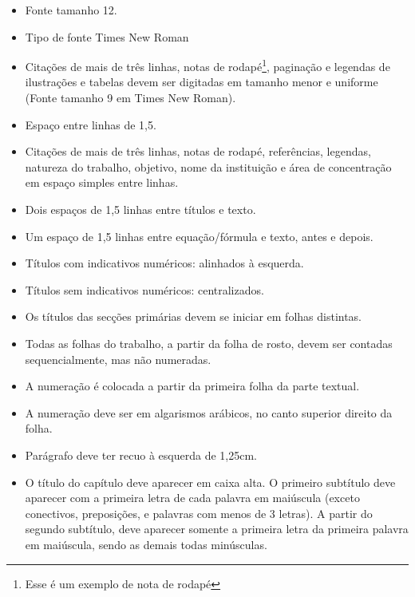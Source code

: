 \documentclass{templateppgmo}
\numberwithin{figure}{chapter}
\numberwithin{table}{chapter}
\numberwithin{quadro}{chapter}
\numberwithin{algoritmo}{chapter}
\numberwithin{codigo}{chapter}
\begin{document}
\begin{itemize}
\item Fonte tamanho 12.

\item Tipo de fonte Times New Roman

\item Citações de mais de três linhas, notas de rodapé\footnote{Esse é um exemplo de nota de rodapé}, paginação e legendas de ilustrações e tabelas devem ser digitadas em tamanho menor e uniforme (Fonte tamanho 9 em Times New Roman).

\item Espaço entre linhas de 1,5.

\item Citações de mais de três linhas, notas de rodapé, referências, legendas, natureza do trabalho, objetivo, nome da instituição e área de concentração em espaço simples entre linhas.

\item Dois espaços de 1,5 linhas entre títulos e texto. 

\item Um espaço de 1,5 linhas entre equação/fórmula e texto, antes e depois.

\item Títulos com indicativos numéricos: alinhados à esquerda.

\item Títulos sem indicativos numéricos: centralizados. 

\item Os títulos das secções primárias devem se iniciar em folhas distintas.

\item Todas as folhas do trabalho, a partir da folha de rosto, devem ser contadas sequencialmente, mas não numeradas. 

\item A numeração é colocada a partir da primeira folha da parte textual. 

\item A numeração deve ser em algarismos arábicos, no canto superior direito da folha. 

\item Parágrafo deve ter recuo à esquerda de 1,25cm.

\item O título do capítulo deve aparecer em caixa alta. O primeiro subtítulo deve aparecer com a primeira letra de cada palavra em maiúscula (exceto conectivos, preposições, e palavras com menos de 3 letras). A partir do segundo subtítulo, deve aparecer somente a primeira letra da primeira palavra em maiúscula, sendo as demais todas minúsculas.




\end{itemize}
\end{document}
